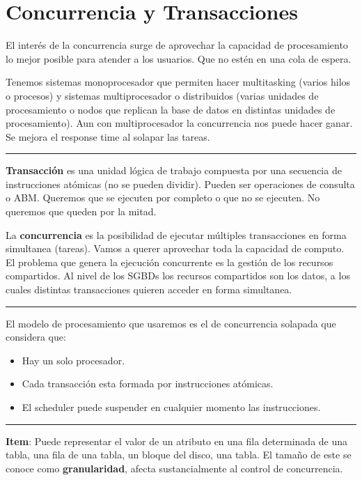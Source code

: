 \section{Concurrencia y Transacciones}

El interés de la concurrencia surge de aprovechar la capacidad de procesamiento lo mejor posible para atender a los usuarios. Que no estén en una cola de espera.

Tenemos sistemas monoprocesador que permiten hacer multitasking (varios hilos o procesos) y sistemas multiprocesador o distribuidos (varias unidades de procesamiento o nodos que replican la base de datos en distintas unidades de procesamiento). Aun con multiprocesador la concurrencia nos puede hacer ganar. Se mejora el response time al solapar las tareas.

\noindent\rule{\textwidth}{0.5pt}

\textbf{Transacción} es una unidad lógica de trabajo compuesta por una secuencia de instrucciones atómicas (no se pueden dividir). Pueden ser operaciones de consulta o ABM. Queremos que se ejecuten por completo o que no se ejecuten. No queremos que queden por la mitad.

\medskip

La \textbf{concurrencia} es la posibilidad de ejecutar múltiples transacciones en forma simultanea (tareas). Vamos a querer aprovechar toda la capacidad de computo.
El problema que genera la ejecución concurrente es la gestión de los recursos compartidos. Al nivel de los SGBDs los recursos compartidos son los datos, a los cuales distintas transacciones quieren acceder en forma simultanea.

\noindent\rule{\textwidth}{0.5pt}

El modelo de procesamiento que usaremos es el de concurrencia solapada que considera que:
\begin{itemize}
\item Hay un solo procesador.
\item Cada transacción esta formada por instrucciones atómicas.
\item El scheduler puede suspender en cualquier momento las instrucciones.
\end{itemize}


\noindent\rule{\textwidth}{0.5pt}

\textbf{Item}: Puede representar el valor de un atributo en una fila determinada de una tabla, una fila de una tabla, un bloque del disco, una tabla. El tamaño de este se conoce como \textbf{granularidad}, afecta sustancialmente al control de concurrencia.

